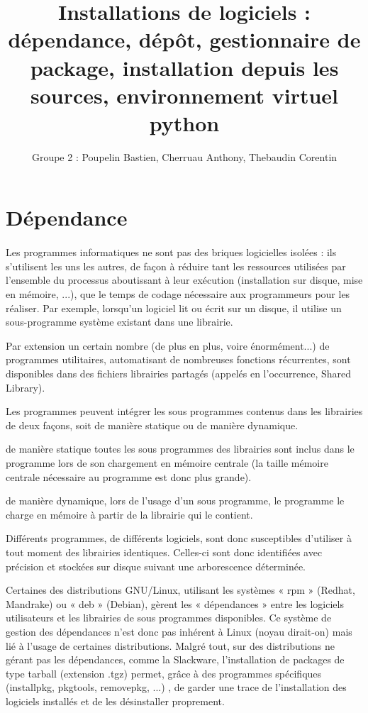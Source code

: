 \documentclass[a4paper,10pt]{article}
\title{\textbf{Installations de logiciels :} \\ dépendance, dépôt, gestionnaire de package, installation depuis les sources, environnement virtuel python}
\author{Groupe 2 : Poupelin Bastien, Cherruau Anthony, Thebaudin Corentin}
\date{}
\begin{document}
\maketitle
\clearpage
\tableofcontents

\clearpage



\section{Dépendance}
\paragraph{}
Les programmes informatiques ne sont pas des briques logicielles isolées : ils s’utilisent les uns les autres, de façon à réduire tant les ressources utilisées par l’ensemble du processus aboutissant à leur exécution (installation sur disque, mise en mémoire, ...), que le temps de codage nécessaire aux programmeurs pour les réaliser. Par exemple, lorsqu’un logiciel lit ou écrit sur un disque, il utilise un sous-programme système existant dans une librairie.

Par extension un certain nombre (de plus en plus, voire énormément...) de programmes utilitaires, automatisant de nombreuses fonctions récurrentes, sont disponibles dans des fichiers librairies partagés (appelés en l’occurrence, Shared Library).

Les programmes peuvent intégrer les sous programmes contenus dans les librairies de deux façons, soit de manière statique ou de manière dynamique.

de manière statique toutes les sous programmes des librairies sont inclus dans le programme lors de son chargement en mémoire centrale (la taille mémoire centrale nécessaire au programme est donc plus grande).

de manière dynamique, lors de l’usage d’un sous programme, le programme le charge en mémoire à partir de la librairie qui le contient.

Différents programmes, de différents logiciels, sont donc susceptibles d’utiliser à tout moment des librairies identiques. Celles-ci sont donc identifiées avec précision  et stockées sur disque suivant une arborescence déterminée.

Certaines des distributions GNU/Linux, utilisant les systèmes « rpm » (Redhat, Mandrake) ou « deb » (Debian), gèrent les « dépendances » entre les logiciels utilisateurs et les librairies de sous programmes disponibles. Ce système de gestion des dépendances n’est donc pas inhérent à Linux (noyau dirait-on) mais lié à l’usage de certaines distributions. Malgré tout, sur des distributions ne gérant pas les dépendances, comme la Slackware, l’installation de packages de type tarball (extension .tgz) permet, grâce à des programmes spécifiques (installpkg, pkgtools, removepkg, ...) , de garder une trace de l’installation des logiciels installés et de les désinstaller proprement.
\end{document}
